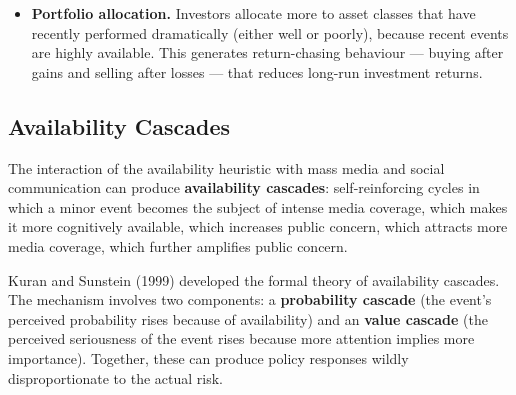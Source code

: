 \documentclass[12pt, letterpaper]{article}
\begin{document}
\begin{itemize}
\item \textbf{Portfolio allocation.} Investors allocate more to asset classes that have recently performed dramatically (either well or poorly), because recent events are highly available. This generates return-chasing behaviour --- buying after gains and selling after losses --- that reduces long-run investment returns.
\end{itemize}

\medskip


\subsection{Availability Cascades}


The interaction of the availability heuristic with mass media and social communication can produce \textbf{availability cascades}: self-reinforcing cycles in which a minor event becomes the subject of intense media coverage, which makes it more cognitively available, which increases public concern, which attracts more media coverage, which further amplifies public concern.

Kuran and Sunstein (1999) developed the formal theory of availability cascades. The mechanism involves two components: a \textbf{probability cascade} (the event's perceived probability rises because of availability) and an \textbf{value cascade} (the perceived seriousness of the event rises because more attention implies more importance). Together, these can produce policy responses wildly disproportionate to the actual risk.
\end{document}
